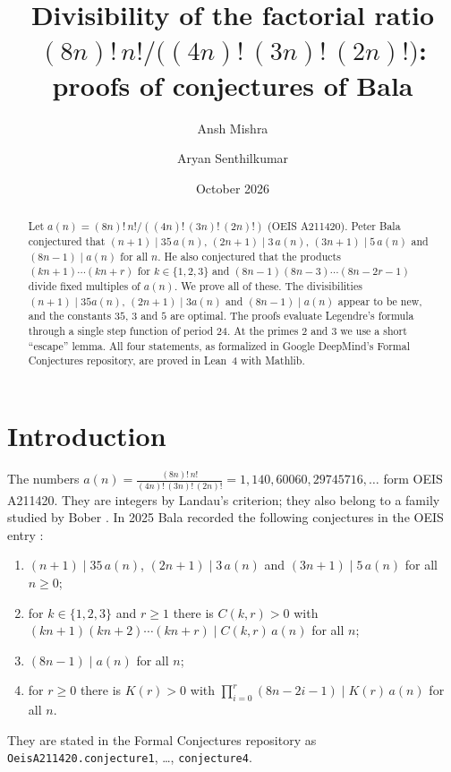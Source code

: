 \documentclass[11pt]{amsart}
\theoremstyle{remark}
\newcommand{\lean}[1]{\texttt{#1}}
\begin{document}
\title[Divisibility of a factorial ratio]{Divisibility of the factorial ratio $(8n)!\,n!/\bigl((4n)!\,(3n)!\,(2n)!\bigr)$: proofs of conjectures of Bala}

\author{Ansh Mishra}
\author{Aryan Senthilkumar}

\date{October 2026}

\begin{abstract}
Let $a(n)=(8n)!\,n!/((4n)!\,(3n)!\,(2n)!)$ (OEIS A211420).
Peter Bala conjectured that $(n+1)\mid35\,a(n)$, $(2n+1)\mid3\,a(n)$, $(3n+1)\mid5\,a(n)$ and $(8n-1)\mid a(n)$ for all $n$.
He also conjectured that the products $(kn+1)\cdots(kn+r)$ for $k\in\{1,2,3\}$ and $(8n-1)(8n-3)\cdots(8n-2r-1)$ divide fixed multiples of $a(n)$.
We prove all of these.
The divisibilities $(n+1)\mid35a(n)$, $(2n+1)\mid3a(n)$ and $(8n-1)\mid a(n)$ appear to be new, and the constants $35$, $3$ and $5$ are optimal.
The proofs evaluate Legendre's formula through a single step function of period $24$.
At the primes $2$ and $3$ we use a short ``escape'' lemma.
All four statements, as formalized in Google DeepMind's Formal Conjectures repository, are proved in Lean~4 with Mathlib.
\end{abstract}

\maketitle

\section{Introduction}

The numbers $a(n)=\frac{(8n)!\,n!}{(4n)!\,(3n)!\,(2n)!}=1,140,60060,29745716,\dots$ form OEIS A211420.
They are integers by Landau's criterion; they also belong to a family studied by Bober \cite{Bober}.
In 2025 Bala recorded the following conjectures in the OEIS entry \cite{OEIS}:
\begin{enumerate}
\item[(C1)] $(n+1)\mid35\,a(n)$, $(2n+1)\mid3\,a(n)$ and $(3n+1)\mid5\,a(n)$ for all $n\ge0$;
\item[(C2)] for $k\in\{1,2,3\}$ and $r\ge1$ there is $C(k,r)>0$ with $(kn+1)(kn+2)\cdots(kn+r)\mid C(k,r)\,a(n)$ for all $n$;
\item[(C3)] $(8n-1)\mid a(n)$ for all $n$;
\item[(C4)] for $r\ge0$ there is $K(r)>0$ with $\prod_{i=0}^{r}(8n-2i-1)\mid K(r)\,a(n)$ for all $n$.
\end{enumerate}
They are stated in the Formal Conjectures repository \cite{FC} as \lean{OeisA211420.conjecture1}, \dots, \lean{conjecture4}.
\end{document}
